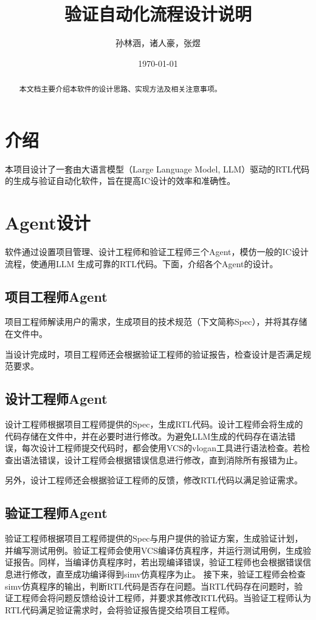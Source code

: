 \documentclass[UTF8]{ctexart}
\title{验证自动化流程设计说明}
\author{孙林涵，诸人豪，张煜}
\date{\today}
\begin{document}
\maketitle

\begin{abstract}
本文档主要介绍本软件的设计思路、实现方法及相关注意事项。
\end{abstract}

\section{介绍}
本项目设计了一套由大语言模型（Large Language Model, LLM）驱动的RTL代码的生成与验证自动化软件，旨在提高IC设计的效率和准确性。

\section{Agent设计}
软件通过设置项目管理、设计工程师和验证工程师三个Agent，模仿一般的IC设计流程，使通用LLM
生成可靠的RTL代码。下面，介绍各个Agent的设计。

\subsection{项目工程师Agent}
项目工程师解读用户的需求，生成项目的技术规范（下文简称Spec），并将其存储在文件中。

当设计完成时，项目工程师还会根据验证工程师的验证报告，检查设计是否满足规范要求。


\subsection{设计工程师Agent}
设计工程师根据项目工程师提供的Spec，生成RTL代码。设计工程师会将生成的代码存储在文件中，并在必要时进行修改。为避免LLM生成的代码存在语法错误，每次设计工程师提交代码时，都会使用VCS的vlogan工具进行语法检查。若检查出语法错误，设计工程师会根据错误信息进行修改，直到消除所有报错为止。

另外，设计工程师还会根据验证工程师的反馈，修改RTL代码以满足验证需求。

\subsection{验证工程师Agent}
验证工程师根据项目工程师提供的Spec与用户提供的验证方案，生成验证计划，并编写测试用例。验证工程师会使用VCS编译仿真程序，并运行测试用例，生成验证报告。同样，当编译仿真程序时，若出现编译错误，验证工程师也会根据错误信息进行修改，直至成功编译得到simv仿真程序为止。
接下来，验证工程师会检查simv仿真程序的输出，判断RTL代码是否存在问题。当RTL代码存在问题时，验证工程师会将问题反馈给设计工程师，并要求其修改RTL代码。当验证工程师认为RTL代码满足验证需求时，会将验证报告提交给项目工程师。
\end{document}
